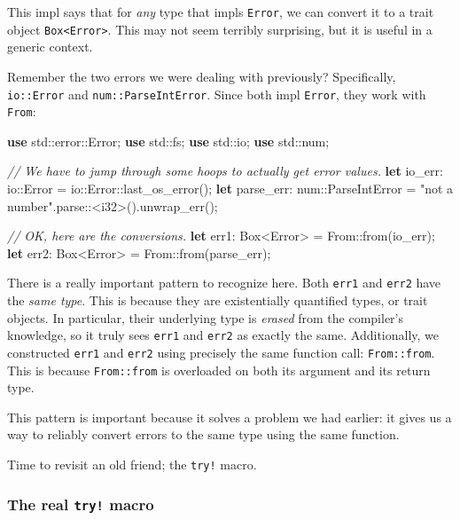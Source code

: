 \documentclass[a4paper,]{book}
\newenvironment{Shaded}{\begin{snugshade}}{\end{snugshade}}
\newcommand{\KeywordTok}[1]{\textcolor[rgb]{0.13,0.29,0.53}{\textbf{{#1}}}}
\newcommand{\DataTypeTok}[1]{\textcolor[rgb]{0.13,0.29,0.53}{{#1}}}
\newcommand{\StringTok}[1]{\textcolor[rgb]{0.31,0.60,0.02}{{#1}}}
\newcommand{\CommentTok}[1]{\textcolor[rgb]{0.56,0.35,0.01}{\textit{{#1}}}}
\newcommand{\NormalTok}[1]{{#1}}
\begin{document}
This impl says that for \emph{any} type that impls \texttt{Error}, we
can convert it to a trait object
\texttt{Box\textless{}Error\textgreater{}}. This may not seem terribly
surprising, but it is useful in a generic context.

Remember the two errors we were dealing with previously? Specifically,
\texttt{io::Error} and \texttt{num::ParseIntError}. Since both impl
\texttt{Error}, they work with \texttt{From}:

\begin{Shaded}
\begin{Highlighting}[]
\KeywordTok{use} \NormalTok{std::error::Error;}
\KeywordTok{use} \NormalTok{std::fs;}
\KeywordTok{use} \NormalTok{std::io;}
\KeywordTok{use} \NormalTok{std::num;}

\CommentTok{// We have to jump through some hoops to actually get error values.}
\KeywordTok{let} \NormalTok{io_err: io::Error = io::Error::last_os_error();}
\KeywordTok{let} \NormalTok{parse_err: num::ParseIntError = }\StringTok{"not a number"}\NormalTok{.parse::<}\DataTypeTok{i32}\NormalTok{>().unwrap_err();}

\CommentTok{// OK, here are the conversions.}
\KeywordTok{let} \NormalTok{err1: }\DataTypeTok{Box}\NormalTok{<Error> = From::from(io_err);}
\KeywordTok{let} \NormalTok{err2: }\DataTypeTok{Box}\NormalTok{<Error> = From::from(parse_err);}
\end{Highlighting}
\end{Shaded}

There is a really important pattern to recognize here. Both
\texttt{err1} and \texttt{err2} have the \emph{same type}. This is
because they are existentially quantified types, or trait objects. In
particular, their underlying type is \emph{erased} from the compiler's
knowledge, so it truly sees \texttt{err1} and \texttt{err2} as exactly
the same. Additionally, we constructed \texttt{err1} and \texttt{err2}
using precisely the same function call: \texttt{From::from}. This is
because \texttt{From::from} is overloaded on both its argument and its
return type.

This pattern is important because it solves a problem we had earlier: it
gives us a way to reliably convert errors to the same type using the
same function.

Time to revisit an old friend; the \texttt{try!} macro.

\hypertarget{the-real-try-macro}{\subsubsection{\texorpdfstring{The real
\texttt{try!} macro}{The real try! macro}}\label{the-real-try-macro}}
\end{document}
